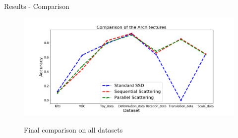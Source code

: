 \documentclass[compress]{beamer}
\begin{document}
	\begin{frame}{Results - Comparison}
		\begin{figure}[!htb]
			\centering
			\includegraphics[width=\textwidth]{images/comparison_scaled.png}
			\label{fig:comparison}
			\caption{Final comparison on all datasets}
		\end{figure}
	\end{frame}
\end{document}

